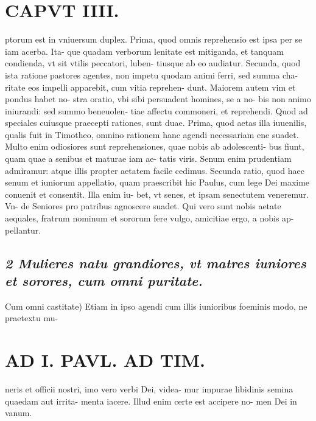 \documentclass{article}
\begin{document}
\begin{pages}
\section*{CAPVT  IIII. }
\marginpar{[ p.251 ]}\pstart ptorum est in vniuersum duplex. Prima, quod omnis reprehensio est ipsa per se iam acerba. Ita- que quadam verborum lenitate est mitiganda, et tanquam condienda, vt sit vtilis peccatori, luben- tiusque ab eo audiatur.  \pend\pstart Secunda, quod ista ratione pastores agentes, non impetu quodam animi ferri, sed summa cha- ritate eos impelli apparebit, cum vitia reprehen- dunt. Maiorem autem vim et pondus habet no- stra oratio, vbi sibi persuadent homines, se a no- bis non animo iniurandi: sed summo beneuolen- tiae affectu commoneri, et reprehendi.  \pend\pstart Quod ad speciales cuiusque praecepti rationes, sunt duae. Prima, quod aetas illa iuuenilis, qualis fuit in Timotheo, omnino rationem hanc agendi necessariam ene suadet. Multo enim odiosiores sunt reprehensiones, quae nobis ab adolescenti- bus fiunt, quam quae a senibus et maturae iam ae- tatis viris. Senum enim prudentiam admiramur: atque illis propter aetatem facile cedimus.  \pend\pstart Secunda ratio, quod haec senum et iuniorum appellatio, quam praescribit hic Paulus, cum lege Dei maxime conuenit et consentit. Illa enim iu- bet, vt senes, et ipsam senectutem veneremur. Vn- de Seniores pro patribus agnoscere suadet. Qui vero sunt nobis aetate aequales, fratrum nominum et sororum fere vulgo, amicitiae ergo, a nobis ap- pellantur.  \pend
{}
{}
\subsection*{\textit{2 Mulieres natu grandiores, vt matres iuniores et sorores, cum omni puritate. }}\pstart Cum omni castitate) Etiam in ipso agendi cum illis iunioribus foeminis modo, ne praetextu mu-  \pend
\section*{AD I. PAVL. AD TIM. }
\marginpar{[ p.252 ]}\pstart neris et officii nostri, imo vero verbi Dei, videa- mur impurae libidinis semina quaedam aut irrita- menta iacere. Illud enim certe est accipere no- men Dei in vanum.  \pend
{}
{}

\end{pages}
\end{document}
